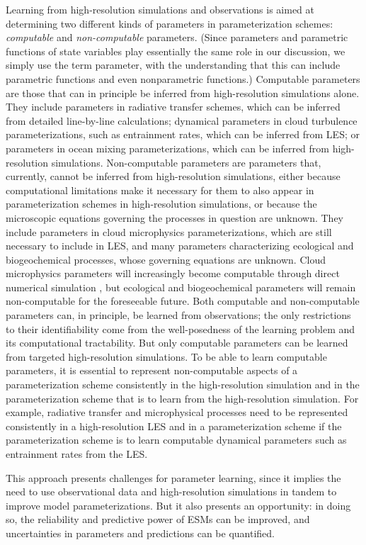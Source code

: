 \documentclass[draft]{agujournal}
\begin{document}
Learning from  high-resolution simulations and observations is aimed at determining two different kinds of parameters in parameterization schemes: \emph{computable} and \emph{non-computable} parameters. (Since parameters and parametric functions of state variables play essentially the same role in our discussion, we simply use the term parameter, with the understanding that this can include parametric functions and even nonparametric functions.) Computable parameters are those that can in principle be inferred from high-resolution simulations alone. They include parameters in radiative transfer schemes, which can be inferred from detailed line-by-line calculations; dynamical parameters in cloud turbulence parameterizations, such as entrainment rates, which can be inferred from LES; or parameters in ocean mixing parameterizations, which can be inferred from high-resolution simulations. Non-computable parameters are parameters that, currently, cannot be inferred from high-resolution simulations, either because computational limitations make it necessary for them to also appear in parameterization schemes in high-resolution simulations, or because the microscopic equations governing the processes in question are unknown. They include parameters in cloud microphysics parameterizations, which are still necessary to include in LES, and many parameters characterizing ecological and biogeochemical processes, whose governing equations are unknown. Cloud microphysics parameters will increasingly become computable through direct numerical simulation \citep{Devenish12a,Grabowski13a}, but ecological and biogeochemical parameters will remain non-computable for the foreseeable future. Both computable and non-computable parameters can, in principle, be learned from observations; the only restrictions to their identifiability come  from the well-posedness of the learning problem and its computational tractability. But only computable parameters can be learned from targeted high-resolution simulations. To be able to learn computable parameters, it is essential to represent non-computable aspects of a parameterization scheme consistently in the high-resolution simulation and in the parameterization scheme that is to learn from the high-resolution simulation. For example, radiative transfer and microphysical processes need to be represented consistently in a high-resolution LES and in a parameterization scheme if the parameterization scheme is to learn computable dynamical parameters such as entrainment rates from the LES. 

This approach presents challenges for parameter learning, since it implies the need to use observational data and high-resolution simulations in tandem to improve model parameterizations. But it also presents an opportunity: in doing so, the reliability and predictive power of ESMs can be improved, and uncertainties in parameters and predictions can be quantified.
\end{document}
